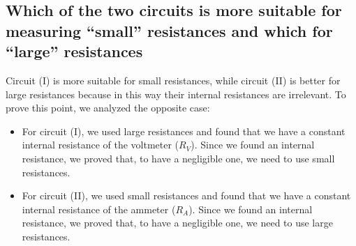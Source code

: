 \documentclass[notitlepage]{report}
\numberwithin{equation}{section}
\theoremstyle{plain}
\theoremstyle{definition}
\theoremstyle{remark}
\begin{document}
\begin{table}[ht]
       \caption{Data collected for the measurements of \(R_V\) (left) and
       \(R_A\) (right)}\label{fig:data}
   \end{table}

\subsection{Which of the two circuits is more suitable for measuring ``small''
resistances and which for ``large'' resistances}
Circuit (I) is more suitable for small resistances, while circuit (II) is better
for large resistances because in this way their internal resistances are
irrelevant. To prove this point, we analyzed the opposite case:
\begin{itemize}
    \item For circuit (I), we used large resistances and found that we have a constant internal resistance of the voltmeter ($R_V$). Since we found an internal resistance, we proved that, to have a negligible one, we need to use small resistances.
    \item For circuit (II), we used small resistances and found that we have a constant internal resistance of the ammeter ($R_A$). Since we found an internal resistance, we proved that, to have a negligible one, we need to use large resistances.
\end{itemize}
\end{document}
